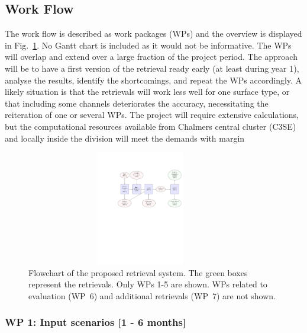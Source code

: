 \documentclass[12pt,oneside,a4paper]{article}
\begin{document}
\subsection{Work Flow}
\label{sec:wp}


The work flow is described as work packages (WPs) and the overview is displayed
in Fig.~\ref{fig:flowchart}. No Gantt chart is included as it would not be
informative. The WPs will overlap and extend over a large fraction of the
project period. The approach will be to have a first version of the retrieval
ready early (at least during year 1), analyse the results, identify the
shortcomings, and repeat the WPs accordingly. A likely situation is that the
retrievals will work less well for one surface type, or that including some
channels deteriorates the accuracy, necessitating the reiteration of one or
several WPs. The project will require extensive calculations, but the
computational resources available from Chalmers central cluster (C3SE) and
locally inside the division will meet the demands with margin

\begin{figure}
	\begin{minipage}[c]{0.75\textwidth}
		\includegraphics[trim=100 400 15 125,clip,height = 50mm, width=100mm]{flowchart.pdf}
	\end{minipage}\hfill
	\begin{minipage}[c]{0.24\textwidth}
      \caption{Flowchart of the proposed retrieval system. The green boxes
        represent the retrievals. Only WPs 1-5 are shown. WPs related to
        evaluation (WP~6) and additional retrievals (WP~7) are not shown.
      } \label{fig:flowchart}
	\end{minipage}
\end{figure}

\vspace{-1ex}

\subsubsection*{WP 1: Input scenarios [1 - 6 months]}
%
\end{document}
